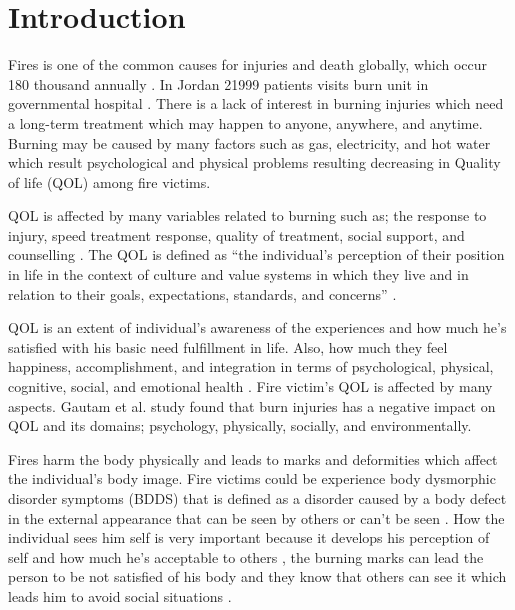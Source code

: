 \documentclass{NSP1}
\begin{document}
\vspace{3mm}

\vspace{1mm}
\noindent{\color{rulecolor}\rule{\textwidth}{1pt}}
\vspace{3mm}


\section{Introduction}
Fires is one of the common causes for injuries and death globally, which occur 180 thousand annually \cite{WHO2023}. In Jordan 21999 patients visits burn unit in governmental hospital \cite{MOH2025}. There is a lack of interest in burning injuries which need a long-term treatment which may happen to anyone, anywhere, and anytime. Burning may be caused by many factors such as gas, electricity, and hot water which result psychological and physical problems resulting decreasing in Quality of life (QOL) among fire victims.

QOL is affected by many variables related to burning such as; the response to injury, speed treatment response, quality of treatment, social support, and counselling \cite{Hunt2012}. The QOL is defined as ``the individual's perception of their position in life in the context of culture and value systems in which they live and in relation to their goals, expectations, standards, and concerns'' \cite{Ho2024}.

QOL is an extent of individual's awareness of the experiences and how much he's satisfied with his basic need fulfillment in life. Also, how much they feel happiness, accomplishment, and integration in terms of psychological, physical, cognitive, social, and emotional health \cite{AlHarthi2017}. Fire victim's QOL is affected by many aspects. Gautam et al. \cite{Gautam2022} study found that burn injuries has a negative impact on QOL and its domains; psychology, physically, socially, and environmentally.

Fires harm the body physically and leads to marks and deformities which affect the individual's body image. Fire victims could be experience body dysmorphic disorder symptoms (BDDS) that is defined as a disorder caused by a body defect in the external appearance that can be seen by others or can't be seen \cite{Ruck2024}. How the individual sees him self is very important because it develops his perception of self and how much he's acceptable to others \cite{Sreshta2017}, the burning marks can lead the person to be not satisfied of his body and they know that others can see it which leads him to avoid social situations \cite{Alhammadi2020}.
\end{document}

